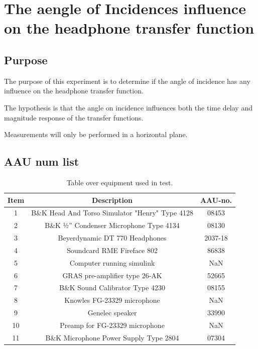 
\section{The aengle of Incidences influence on the headphone transfer function} \label{sec:AngleOfIncidence}

\subsection{Purpose}
The purpose of this experiment is to determine if the angle of incidence has any influence on the headphone transfer function. 

The hypothesis is that the angle on incidence influences both the time delay and magnitude response of the transfer functions.

Measurements will only be performed in a horizontal plane. 

\subsection{AAU num list}
\begin{table}[H]
	\centering
	\begin{tabular}{ c c c } \toprule
		{Item}	& {Description} 						& {AAU-no}. \\ \bottomrule 
		1	&	B\&K Head And Torso Simulator "Henry" Type 4128	& 08453	\\
		2	&	B\&K ½'' Condenser Microphone Type 4134 	& 08130		\\
		3	&	Beyerdynamic DT 770 Headphones				& 2037-18		\\
		4	&	Soundcard RME Fireface 802					& 86838		\\
		5	&	Computer running simulink		& NaN		\\
		6	&	GRAS pre-amplifier type 26-AK			& 52665		\\
		7	&	B\&K Sound Calibrator Type 4230				& 08155		\\ 
		8	&	Knowles FG-23329 microphone					& NaN		\\
		9	&	Genelec speaker								& 33990		\\ 
		10	&	Preamp for FG-23329  microphone	& NaN\\
		11	& 	B\&K Microphone Power Supply Type 2804		& 07304		\\
		\bottomrule
	\end{tabular}
	\caption{Table over equipment used in test.}
	\label{tab:AngleOfIncideceHP}
\end{table}

